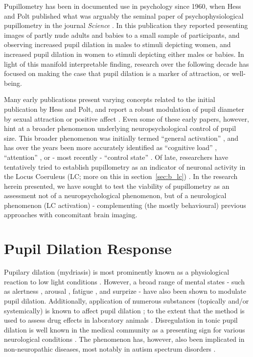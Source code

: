 	Pupillometry has been in documented use in psychology since 1960, when Hess and Polt published what was arguably the seminal paper of psychophysiological pupillometry in the journal \textit{Science} \citep{HESS1960}.
	In this publication they reported presenting images of partly nude adults and babies to a small sample of participants, and observing increased pupil dilation in males to stimuli depicting women, and increased pupil dilation in women to stimuli depicting either males or babies.
	In light of this manifold interpretable finding, research over the following decade has focused on making the case that pupil dilation is a marker of attraction, or well-being.
	
	Many early publications present varying concepts related to the initial publication by Hess and Polt, and report a robust modulation of pupil diameter by sexual attraction \citep{Goldwater1972, HESS1965} or positive affect \citep{Nunally1967, Bradshaw1967}.
	Even some of these early papers, however, hint at a broader phenomenon underlying neuropsychological control of pupil size.
	This broader phenomenon was initially termed “general activation” \citep{Nunally1967}, and has over the years been more accurately identified as “cognitive load” \citep{Laeng2011,Zekveld2011}, “attention” \citep{Wykowska2013,Kraemer2000}, or - most recently - “control state” \citep{Hayes2013}.
	Of late, researchers have tentatively tried to establish pupillometry as an indicator of neuronal activity in the Locus Coeruleus (LC; more on this in section~\ref{sec:b_lc}) \citep{Gilzenrat2010}.
	In the research herein presented, we have sought to test the viability of pupillometry as an assessment not of a neuropsychological phenomenon, but of a neurological phenomenon (LC activation) - 
	complementing (the mostly behavioural) previous approaches \citep{Gilzenrat2010,Granholm2004} with concomitant brain imaging.
	
    \section{Pupil Dilation Response}\label{sec:b_pdr}
	Pupilary dilation (mydriasis) is most prominently known as a physiological reaction to low light conditions \citep{Ellis1981}. 
	However, a broad range of mental states - 
	such as alertness \citep{Yoss1970}, arousal \citep{Bradshaw1967}, fatigue \citep{Morad2000}, and surprize \citep{Preuschoff2011} -
	have also been shown to modulate pupil dilation.
	Additionally, application of numerous substances (topically and/or systemically) is known to affect pupil dilation \citep{Theofilopoulos1988, Bye1979, Phillips2000}; to the extent that the method is used to assess drug effects in laboratory animals \citep{Murray1981}.
	Disregulation in tonic pupil dilation is well known in the medical community as a presenting sign for various neurological conditions \citep{Caglayan2013}.
	The phenomenon has, however, also been implicated in non-neuropathic diseases, most notably in autism spectrum disorders \citep{Anderson2013}.
	
